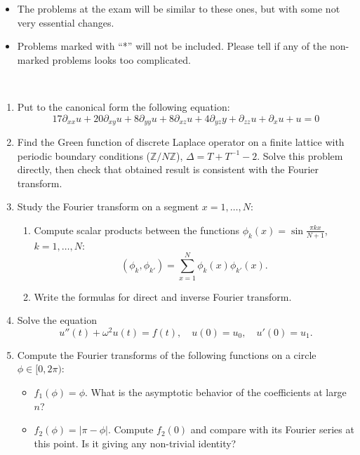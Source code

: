 \documentclass[a4paper,11pt]{article}
\title{}
\author{}
\begin{document}
\maketitle

\begin{itemize}
\item The problems at the exam will be similar to these ones, but with some not very essential changes.
\item Problems marked with ``*'' will not be included. Please tell if any of the non-marked problems looks too complicated.
\end{itemize}

\

\begin{enumerate}
\item\label{item:1} Put to the canonical form the following equation:
\begin{equation*}
17 \partial_{xx}u + 20 \partial_{xy}u+8\partial_{yy}u+8\partial_{xz}u+4\partial_{yz}y+\partial_{zz}u+\partial_xu+u=0
\end{equation*}

\item\label{item:2} Find the Green function of discrete Laplace operator on a finite lattice with periodic boundary conditions (\(\mathbb{Z}/N\mathbb{Z}\)), \(\Delta=T+T^{-1}-2\). Solve this problem directly, then check that obtained result is consistent with the Fourier transform.

\item\label{item:3} Study the Fourier transform on a segment \(x=1,\ldots,N\):
\begin{enumerate}
\item\label{item:4} Compute scalar products between the functions \(\phi_k(x)=\sin \frac{\pi k x}{N+1}\), \(k=1,\ldots, N\):
\[(\phi_k,\phi_{k'})=\sum_{x=1}^N\phi_k(x)\phi_{k'}(x).\]
\item\label{item:5} Write the formulas for direct and inverse Fourier transform.
\end{enumerate}

\item\label{item:6} Solve the equation
\begin{equation*}
u''(t)+\omega^2u(t)=f(t), \quad u(0)=u_0, \quad u'(0)=u_1.
\end{equation*}

\item\label{item:7} Compute the Fourier transforms of the following functions on a circle \(\phi\in [0,2\pi)\):
\begin{itemize}
\item \(f_1(\phi)=\phi\). What is the asymptotic behavior of the coefficients at large \(n\)?
\item \(f_2(\phi)=|\pi-\phi|\). Compute \(f_2(0)\) and compare with its Fourier series at this point. Is it giving any non-trivial identity?
\end{itemize}


\end{enumerate}
\end{document}
